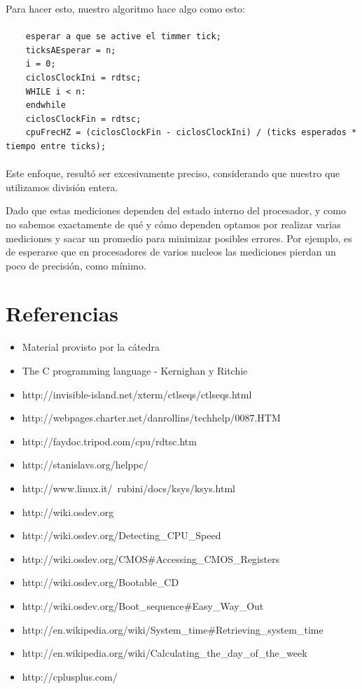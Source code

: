 \documentclass[a4paper,10pt]{article}
\begin{document}
    Para hacer esto, nuestro algoritmo hace algo como esto:
    \paragraph*{}
    \begin{lstlisting}
    esperar a que se active el timmer tick;
    ticksAEsperar = n;
    i = 0;
    ciclosClockIni = rdtsc;
    WHILE i < n:
    endwhile
    ciclosClockFin = rdtsc;
    cpuFrecHZ = (ciclosClockFin - ciclosClockIni) / (ticks esperados * tiempo entre ticks);
    \end{lstlisting}
    \paragraph*{}   
    Este enfoque, resultó ser excesivamente preciso, considerando que nuestro que utilizamos división entera.

    Dado que estas mediciones dependen del estado interno del procesador, y como no sabemos exactamente de qué y cómo dependen optamos por realizar varias mediciones
    y sacar un promedio para minimizar posibles errores. Por ejemplo, es de esperarse que en procesadores de varios nucleos las mediciones
    pierdan un poco de precisión, como mínimo.

\newpage     
\section{Referencias}

\begin{itemize}
  \item Material provisto por la cátedra
  \item The C programming language - Kernighan y Ritchie
  \item http://invisible-island.net/xterm/ctlseqs/ctlseqs.html
  \item http://webpages.charter.net/danrollins/techhelp/0087.HTM
  \item http://faydoc.tripod.com/cpu/rdtsc.htm
  \item http://stanislavs.org/helppc/
  \item http://www.linux.it/~rubini/docs/ksys/ksys.html
  \item http://wiki.osdev.org
  \item http://wiki.osdev.org/Detecting\_CPU\_Speed
  \item	http://wiki.osdev.org/CMOS\#Accessing\_CMOS\_Registers
  \item http://wiki.osdev.org/Bootable\_CD
  \item http://wiki.osdev.org/Boot\_sequence\#Easy\_Way\_Out
  \item http://en.wikipedia.org/wiki/System\_time\#Retrieving\_system\_time
  \item http://en.wikipedia.org/wiki/Calculating\_the\_day\_of\_the\_week
  \item http://cplusplus.com/

\end{itemize}
   
\end{document}
